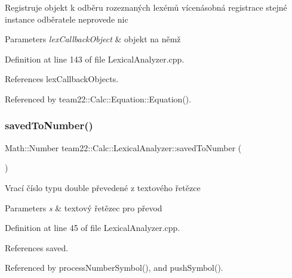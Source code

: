 Registruje objekt k odběru rozeznaných lexémů vícenásobná registrace stejné instance odběratele neprovede nic


\begin{DoxyParams}{Parameters}
{\em lex\+Callback\+Object} & objekt na němž \\
\hline
\end{DoxyParams}


Definition at line 143 of file Lexical\+Analyzer.\+cpp.



References lex\+Callback\+Objects.



Referenced by team22\+::\+Calc\+::\+Equation\+::\+Equation().

\mbox{\label{classteam22_1_1_calc_1_1_lexical_analyzer_a689b52c49cd7c9e87dd468987472af83}} 
\subsubsection{\texorpdfstring{saved\+To\+Number()}{savedToNumber()}}
{\footnotesize\ttfamily Math\+::\+Number team22\+::\+Calc\+::\+Lexical\+Analyzer\+::saved\+To\+Number (\begin{DoxyParamCaption}{ }\end{DoxyParamCaption})\hspace{0.3cm}{\ttfamily [private]}}

Vrací číslo typu double převedené z textového řetězce 
\begin{DoxyParams}{Parameters}
{\em s} & textový řetězec pro převod \\
\hline
\end{DoxyParams}


Definition at line 45 of file Lexical\+Analyzer.\+cpp.



References saved.



Referenced by process\+Number\+Symbol(), and push\+Symbol().

\mbox{\label{classteam22_1_1_calc_1_1_lexical_analyzer_afd6bb48e5de7f8490addc9b326bfeb49}} 
